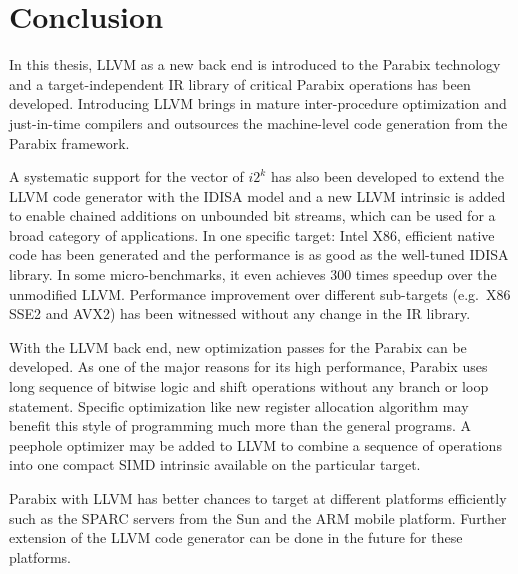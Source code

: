%
%

\chapter{Conclusion}
\label{seven}

In this thesis, LLVM as a new back end is introduced to the Parabix technology and a target-independent IR library of critical Parabix operations has been developed. Introducing LLVM brings in mature inter-procedure optimization and just-in-time compilers and outsources the machine-level code generation from the Parabix framework.

A systematic support for the vector of $i2^k$ has also been developed to extend the LLVM code generator with the IDISA model and a new LLVM intrinsic is added to enable chained additions on unbounded bit streams, which can be used for a broad category of applications. In one specific target: Intel X86, efficient native code has been generated and the performance is as good as the well-tuned IDISA library. In some micro-benchmarks, it even achieves 300 times speedup over the unmodified LLVM\@. Performance improvement over different sub-targets (e.g.\ X86 SSE2 and AVX2) has been witnessed without any change in the IR library.

With the LLVM back end, new optimization passes for the Parabix can be developed. As one of the major reasons for its high performance, Parabix uses long sequence of bitwise logic and shift operations without any branch or loop statement. Specific optimization like new register allocation algorithm may benefit this style of programming much more than the general programs. A peephole optimizer may be added to LLVM to combine a sequence of operations into one compact SIMD intrinsic available on the particular target.

Parabix with LLVM has better chances to target at different platforms efficiently such as the SPARC servers from the Sun and the ARM mobile platform. Further extension of the LLVM code generator can be done in the future for these platforms.

